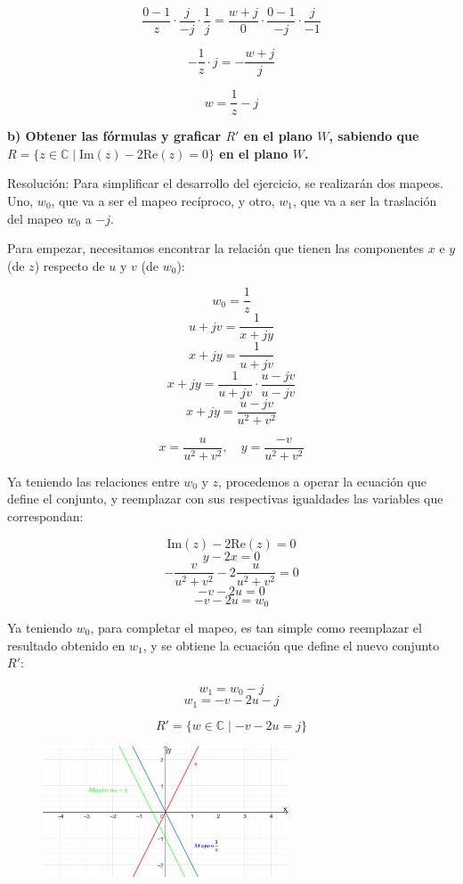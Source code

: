 \documentclass[12pt]{report}
\begin{document}
$$ \frac{0 - 1}{z} \cdot \frac{j}{-j} \cdot \frac{1}{j} = \frac{w + j}{0} \cdot \frac{0 - 1}{-j} \cdot \frac{j}{-1} $$

$$ - \frac{1}{z} \cdot j = - \frac{w + j}{j} $$

$$ w = \frac{1}{z} - j $$

\textbf{b) Obtener las fórmulas y graficar \( R' \) en el plano \( W \), sabiendo que \( R = \{z \in \mathbb{C} \mid \text{Im}(z) - 2\text{Re}(z) = 0\} \) en el plano \( W \).}

Resolución: Para simplificar el desarrollo del ejercicio, se realizarán dos mapeos. Uno, \( w_0 \), que va a ser el mapeo recíproco, y otro, \( w_1 \), que va a ser la traslación del mapeo \( w_0 \) a \( -j \).

Para empezar, necesitamos encontrar la relación que tienen las componentes \( x \) e \( y \) (de \( z \)) respecto de \( u \) y \( v \) (de \( w_0 \)):

$$ w_0 = \frac{1}{z} $$
$$ u + jv = \frac{1}{x + jy} $$
$$ x + jy = \frac{1}{u + jv} $$
$$ x + jy = \frac{1}{u + jv} \cdot \frac{u - jv}{u - jv} $$
$$ x + jy = \frac{u - jv}{u^2 + v^2} $$

$$ x = \frac{u}{u^2 + v^2}, \quad y = \frac{-v}{u^2 + v^2} $$

Ya teniendo las relaciones entre \( w_0 \) y \( z \), procedemos a operar la ecuación que define el conjunto, y reemplazar con sus respectivas igualdades las variables que correspondan:

$$ \text{Im}(z) - 2\text{Re}(z) = 0 $$
$$ y - 2x = 0 $$
$$ -\frac{v}{u^2 + v^2} - 2\frac{u}{u^2 + v^2} = 0 $$
$$ -v - 2u = 0 $$
$$ -v - 2u = w_0 $$

Ya teniendo \( w_0 \), para completar el mapeo, es tan simple como reemplazar el resultado obtenido en \( w_1 \), y se obtiene la ecuación que define el nuevo conjunto \( R' \):

$$ w_1 = w_0 - j $$
$$ w_1 = -v - 2u - j $$

$$ R' = \{w \in \mathbb{C} \mid -v - 2u = j\} $$

\begin{figure}[h] %
    \centering %
    \includegraphics[width=0.65\textwidth]{./Imagenes/foto1Ej3.png} %
\end{figure}
\end{document}
